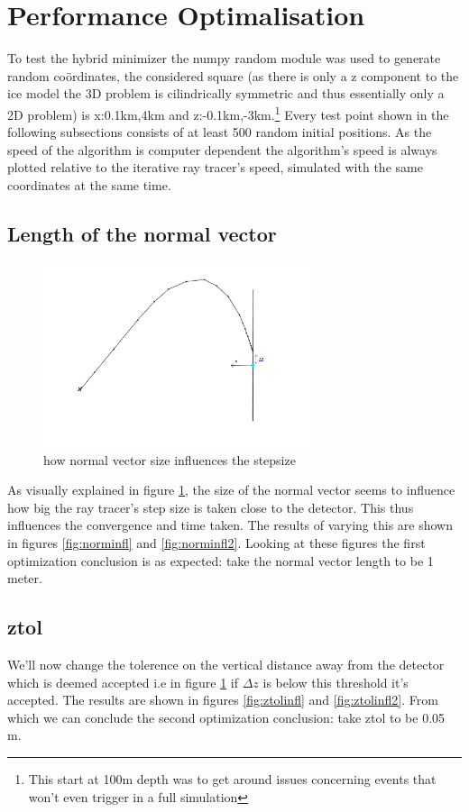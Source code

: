 \documentclass[11pt,a4paper,faculty=we,language=en,doctype=report]{cls/ugent-doc}
\begin{document}
\section{Performance Optimalisation}
To test the hybrid minimizer the numpy random module was used to generate
random coördinates, the considered square (as there is only a z component to
the ice model the 3D problem is cilindrically symmetric and thus essentially
only a 2D problem) is x:0.1km,4km and z:-0.1km,-3km.\footnote{This start at
100m depth was to get around issues concerning events that won't even trigger
in a full simulation} Every test point shown in the following subsections
consists of at least 500 random initial positions.  As the speed of the
algorithm is computer dependent the algorithm's speed is always plotted
relative to the iterative ray tracer's speed, simulated with the same
coordinates at the same time.
\subsection{Length of the normal vector}
\begin{figure}[h!]
	\centering
	\includegraphics[width=0.7\textwidth]{figures/PrincipleNormIllu.pdf}
	\caption{how normal vector size influences the stepsize}
	\label{fig:normexpl}
\end{figure}
As visually explained in figure \ref{fig:normexpl}, the size of the normal vector seems to
influence how big the ray tracer's step size is taken close to the detector. This
thus influences the convergence and time taken. The results of varying this are shown
in figures \ref{fig:norminfl} and \ref{fig:norminfl2}.
Looking at these figures the first optimization conclusion is as expected: 
take the normal vector length to be 1 meter.
\subsection{ztol}
We'll now change the tolerence on the vertical distance away from the detector which is deemed
accepted i.e in figure \ref{fig:normexpl} if $\Delta z$ is below this threshold it's accepted.
The results are shown in figures \ref{fig:ztolinfl} and \ref{fig:ztolinfl2}.
From which we can conclude the second optimization conclusion: take ztol to be 0.05 m.
\end{document}

